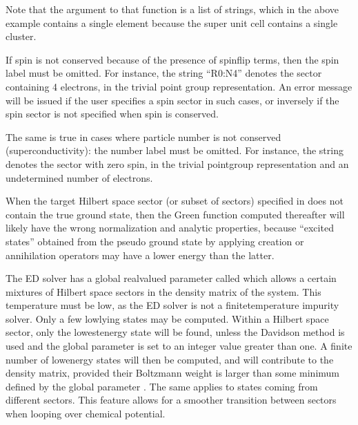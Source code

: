 \documentclass[letterpaper,10pt,english]{sphinxmanual}
\begin{document}
\begin{sphinxVerbatim}[commandchars=\\\{\}]
\PYG{p}{[}\PYG{p}{]}
\end{sphinxVerbatim}

\sphinxAtStartPar
Note that the argument to that function is a list of strings, which in the above example contains a single element because the super unit cell contains a single cluster.

\sphinxAtStartPar
If spin is not conserved because of the presence of spin\sphinxhyphen{}flip terms, then the spin label must be omitted. For instance, the string “R0:N4” denotes the sector containing 4 electrons, in the trivial point group representation. An error message will be issued if the user specifies a spin sector in such cases, or inversely if the spin sector is not specified when spin is conserved.

\sphinxAtStartPar
The same is true in cases where particle number is not conserved (superconductivity): the number label must be omitted.
For instance, the string  denotes the sector with zero spin, in the trivial point\sphinxhyphen{}group representation and an undetermined number of electrons.

\sphinxAtStartPar
When the target Hilbert space sector (or subset of sectors) specified in  does not contain the true ground state, then the Green function computed thereafter will likely have the wrong normalization and analytic properties, because “excited states” obtained from the pseudo ground state by applying creation or annihilation operators may have a lower energy than the latter.

\sphinxAtStartPar
The ED solver has a global real\sphinxhyphen{}valued parameter called  which allows a certain mixtures of Hilbert space sectors in the density matrix of the system. This temperature must be low, as the ED solver is not a finite\sphinxhyphen{}temperature impurity solver. Only a few low\sphinxhyphen{}lying states may be computed. Within a Hilbert space sector, only the lowest\sphinxhyphen{}energy state will be found, unless the Davidson method is used and the global parameter  is set to an integer value greater than one. A finite number of low\sphinxhyphen{}energy states will then be computed, and will contribute to the density matrix, provided their Boltzmann weight is larger than some minimum defined by the global parameter . The same applies to states coming from different sectors. This feature allows for a smoother transition between sectors when looping over chemical potential.
\end{document}
